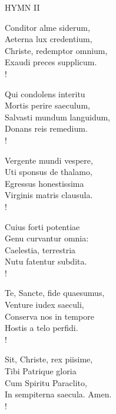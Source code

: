 \noindent\small{\uppercase{Hymn II }}\normalsize\label{advent:lastHymn} 
\begin{cverse}
Conditor alme siderum,\\
Aeterna lux credentium,\\
Christe, redemptor omnium,\\
Exaudi preces supplicum.\\!

Qui condolens interitu\\
Mortis perire saeculum,\\
Salvasti mundum languidum,\\
Donans reis remedium.\\!

Vergente mundi vespere,\\
Uti sponsus de thalamo,\\
Egressus honestissima\\
Virginis matris clausula.\\!

Cuius forti potentiae\\
Genu curvantur omnia:\\
Caelestia, terrestria\\
Nutu fatentur subdita.\\!

Te, Sancte, fide quaesumus,\\
Venture iudex saeculi,\\
Conserva nos in tempore\\
Hostis a telo perfidi.\\!

Sit, Christe, rex piisime,\\
Tibi Patrique gloria\\
Cum Spiritu Paraclito,\\
In sempiterna saecula. Amen.\\!
\end{cverse}

